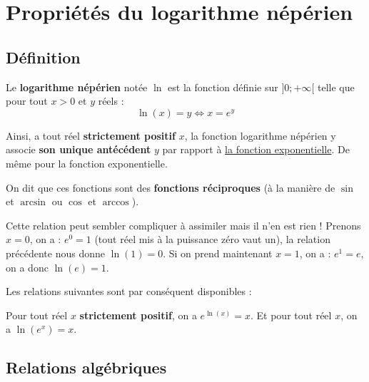 



	\section{Propriétés du logarithme népérien}

	\subsection{Définition}

	\begin{formula}[Définition]
		Le \textbf{logarithme népérien} notée $\ln$ est la fonction définie sur $]0;+\infty[$ telle que pour tout $x > 0$ et $y$ réels :
		\[ \ln(x) = y \iff x = e^y \]
	\end{formula}

	Ainsi, a tout réel \textbf{strictement positif} $x$, la fonction logarithme népérien y associe \textbf{son unique antécédent} $y$ par rapport à \href{https://bacomathiqu.es/cours/premiere/fonction-exponentielle/}{la fonction exponentielle}. De même pour la fonction exponentielle.

	On dit que ces fonctions sont des \textbf{fonctions réciproques} (à la manière de $\sin$ et $\arcsin$ ou $\cos$ et $\arccos$).

	\begin{tip}[Exemple]
		Cette relation peut sembler compliquer à assimiler mais il n'en est rien ! Prenons $x = 0$, on a :
		\newpar
		$e^0 = 1$ (tout réel mis à la puissance zéro vaut un), la relation précédente nous donne $\ln(1) = 0$.
		\newpar
		Si on prend maintenant $x = 1$, on a :
		\newpar
		$e^1 = e$, on a donc $\ln(e) = 1$.
	\end{tip}

	Les relations suivantes sont par conséquent disponibles :

	\begin{formula}
		Pour tout réel $x$ \textbf{strictement positif}, on a $e^{\ln(x)} = x$.
		\newpar
		Et pour tout réel $x$, on a $\ln(e^x) = x$.
	\end{formula}

	\subsection{Relations algébriques}

